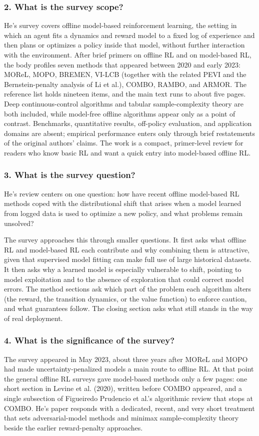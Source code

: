 \documentclass[11pt]{article}
\newcommand{\question}[1]{\subsubsection*{#1}}
\begin{document}
\question{2. What is the survey scope?}

He's survey covers offline model-based reinforcement learning, the setting in which an agent fits a dynamics and reward model to a fixed log of experience and then plans or optimizes a policy inside that model, without further interaction with the environment. After brief primers on offline RL and on model-based RL, the body profiles seven methods that appeared between 2020 and early 2023: MOReL, MOPO, BREMEN, VI-LCB (together with the related PEVI and the Bernstein-penalty analysis of Li et al.), COMBO, RAMBO, and ARMOR. The reference list holds nineteen items, and the main text runs to about five pages. Deep continuous-control algorithms and tabular sample-complexity theory are both included, while model-free offline algorithms appear only as a point of contrast. Benchmarks, quantitative results, off-policy evaluation, and application domains are absent; empirical performance enters only through brief restatements of the original authors' claims. The work is a compact, primer-level review for readers who know basic RL and want a quick entry into model-based offline RL.

\question{3. What is the survey question?}

He's review centers on one question: how have recent offline model-based RL methods coped with the distributional shift that arises when a model learned from logged data is used to optimize a new policy, and what problems remain unsolved?

The survey approaches this through smaller questions. It first asks what offline RL and model-based RL each contribute and why combining them is attractive, given that supervised model fitting can make full use of large historical datasets. It then asks why a learned model is especially vulnerable to shift, pointing to model exploitation and to the absence of exploration that could correct model errors. The method sections ask which part of the problem each algorithm alters (the reward, the transition dynamics, or the value function) to enforce caution, and what guarantees follow. The closing section asks what still stands in the way of real deployment.

\question{4. What is the significance of the survey?}

The survey appeared in May 2023, about three years after MOReL and MOPO had made uncertainty-penalized models a main route to offline RL. At that point the general offline RL surveys gave model-based methods only a few pages: one short section in Levine et al. (2020), written before COMBO appeared, and a single subsection of Figueiredo Prudencio et al.'s algorithmic review that stops at COMBO. He's paper responds with a dedicated, recent, and very short treatment that sets adversarial-model methods and minimax sample-complexity theory beside the earlier reward-penalty approaches.
\end{document}
